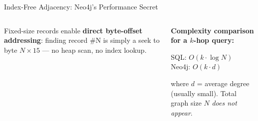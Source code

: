 \documentclass[aspectratio=169]{beamer}
\begin{document}
\begin{frame}{Index-Free Adjacency: Neo4j's Performance Secret}
\begin{columns}[T]
\begin{tcolorbox}[deepdivebox, title={Deep Dive: Storage Record Layout}]
        Fixed-size records enable \textbf{direct byte-offset addressing}: finding record \#N is simply a seek to byte $N \times 15$ — no heap scan, no index lookup.
      \end{tcolorbox}
      \vspace{0.2cm}
      \begin{tcolorbox}
        \scriptsize
        \textbf{Complexity comparison for a $k$-hop query:}
        \begin{center}
          SQL: $O(k \cdot \log N)$ \\
          Neo4j: $O(k \cdot d)$
        \end{center}
        where $d$ = average degree (usually small). Total graph size $N$ \textit{does not appear}.
      \end{tcolorbox}
  \end{columns}
\end{frame}
\end{document}
